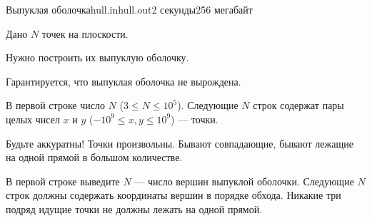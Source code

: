 \begin{problem}{Выпуклая оболочка}{hull.in}{hull.out}{2 секунды}{256 мегабайт}

Дано $N$ точек на плоскости.

Нужно построить их выпуклую оболочку.

Гарантируется, что выпуклая оболочка не вырождена.

\InputFile

В первой строке число $N$ ($3 \le N \le 10^5$).
Следующие $N$ строк содержат пары целых чисел $x$ и $y$ ($-10^9 \le x, y \le 10^9$) --- точки.

Будьте аккуратны! Точки произвольны. Бывают совпадающие, бывают лежащие на одной прямой в большом количестве.

\OutputFile

В первой строке выведите $N$ --- число вершин выпуклой оболочки.
Следующие $N$ строк должны содержать координаты вершин в порядке обхода.
Никакие три подряд идущие точки не должны лежать на одной прямой.

\Example

\begin{example}
%
\end{example}

\end{problem}
